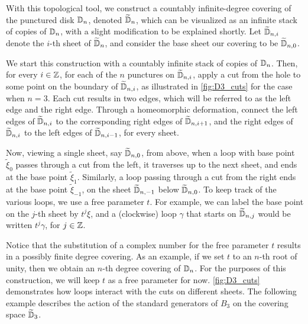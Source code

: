 With this topological tool, we construct a countably infinite-degree covering of the punctured disk $\mathbb{D}_n$, denoted $\widetilde{\mathbb{D}}_n$, which can be visualized as an infinite stack of copies of $\mathbb{D}_n$, with a slight modification to be explained shortly. Let $\widetilde{\mathbb{D}}_{n,i}$ denote the $i$-th sheet of $\widetilde{\mathbb{D}}_n$, and consider the base sheet our covering to be $\widetilde{\mathbb{D}}_{n,0}$.

We start this construction with a countably infinite stack of copies of $\mathbb{D}_n$. Then, for every $i\in\mathbb{Z}$, for each of the $n$ punctures on $\widetilde{\mathbb{D}}_{n,i}$, apply a cut from the hole to some point on the boundary of $\widetilde{\mathbb{D}}_{n,i}$, as illustrated in \cref{fig:D3_cuts} for the case when $n=3$. Each cut results in two edges, which will be referred to as the left edge and the right edge. Through a homeomorphic deformation, connect the left edges of $\widetilde{\mathbb{D}}_{n,i}$ to the corresponding right edges of $\widetilde{\mathbb{D}}_{n,i+1}$, and the right edges of $\widetilde{\mathbb{D}}_{n,i}$ to the left edges of $\widetilde{\mathbb{D}}_{n,i-1}$, for every sheet.

Now, viewing a single sheet, say $\widetilde{\mathbb{D}}_{n,0}$, from above, when a loop with base point $\tilde{\xi}_0$ passes through a cut from the left, it traverses up to the next sheet, and ends at the base point $\tilde{\xi}_1$. Similarly, a loop passing through a cut from the right ends at the base point $\tilde{\xi}_{-1}$, on the sheet $\widetilde{\mathbb{D}}_{n,-1}$ below $\widetilde{\mathbb{D}}_{n,0}$. To keep track of the various loops, we use a free parameter $t$. For example, we can label the base point on the $j$-th sheet by $t^j\xi$, and a (clockwise) loop $\gamma$ that starts on $\widetilde{\mathbb{D}}_{n,j}$ would be written $t^j \gamma$, for $j\in\mathbb{Z}$.

Notice that the substitution of a complex number for the free parameter $t$ results in a possibly finite degree covering. As an example, if we set $t$ to an $n$-th root of unity, then we obtain an $n$-th degree covering of $\mathbb{D}_n$. For the purposes of this construction, we will keep $t$ as a free parameter for now.{ }\cref{fig:D3_cuts} demonstrates how loops interact with the cuts on different sheets. The following example describes the action of the standard generators of $B_3$ on the covering space $\widetilde{\mathbb{D}}_3$.

